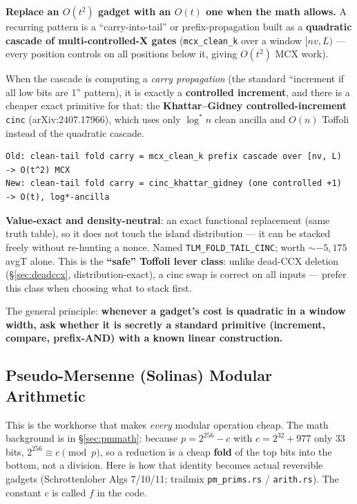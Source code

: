 \documentclass[11pt,a4paper]{article}
\begin{document}
\textbf{Replace an $O(t^2)$ gadget with an $O(t)$ one when the math allows.} A recurring pattern is
a ``carry-into-tail'' or prefix-propagation built as a \textbf{quadratic cascade of
multi-controlled-X gates} (\lstinline{mcx_clean_k} over a window $[nv, L)$ --- every position
controls on all positions below it, giving $O(t^2)$ MCX work).

When the cascade is computing a \emph{carry propagation} (the standard ``increment if all low bits
are 1'' pattern), it is exactly a \textbf{controlled increment}, and there is a cheaper exact
primitive for that: the \textbf{Khattar--Gidney controlled-increment} \texttt{cinc}
(arXiv:2407.17966), which uses only $\log^* n$ clean ancilla and $O(n)$ Toffoli instead of the
quadratic cascade.

\begin{lstlisting}
Old: clean-tail fold carry = mcx_clean_k prefix cascade over [nv, L)   -> O(t^2) MCX
New: clean-tail fold carry = cinc_khattar_gidney (one controlled +1)   -> O(t), log*-ancilla
\end{lstlisting}

\textbf{Value-exact and density-neutral}: an exact functional replacement (same truth table), so it
does not touch the island distribution --- it can be stacked freely without re-hunting a nonce.
Named \texttt{TLM\_FOLD\_TAIL\_CINC}; worth $\sim$$-5{,}175$ avgT alone. This is the \textbf{``safe''
Toffoli lever class}: unlike dead-CCX deletion (\S\ref{sec:deadccx}, distribution-exact), a cinc swap
is correct on all inputs --- prefer this class when choosing what to stack first.

The general principle: \textbf{whenever a gadget's cost is quadratic in a window width, ask whether
it is secretly a standard primitive (increment, compare, prefix-AND) with a known linear
construction.}

\subsection{Pseudo-Mersenne (Solinas) Modular Arithmetic}
\label{sec:pmarith}

This is the workhorse that makes \emph{every} modular operation cheap. The math background is in
\S\ref{sec:pmmath}: because $p = 2^{256} - c$ with $c = 2^{32} + 977$ only 33 bits,
$2^{256} \equiv c \pmod p$, so a reduction is a cheap \textbf{fold} of the top bits into the bottom,
not a division. Here is how that identity becomes actual reversible gadgets (Schrottenloher
Algs 7/10/11; trailmix \lstinline{pm_prims.rs} / \lstinline{arith.rs}). The constant $c$ is called
$f$ in the code.
\end{document}
